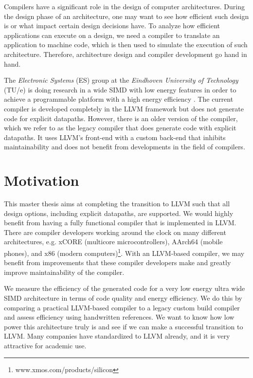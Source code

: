 Compilers have a significant role in the design of computer architectures. During the design phase of an architecture, one may want to see how efficient such design is or what impact certain design decisions have. To analyze how efficient applications can execute on a design, we need a compiler to translate an application to machine code, which is then used to simulate the execution of such architecture. Therefore, architecture design and compiler development go hand in hand.  

The \emph{Electronic Systems} (ES) group at the \emph{Eindhoven University of Technology} (TU/e) is doing research in a wide SIMD with low energy features in order to achieve a programmable platform with a high energy efficiency \cite{dongrio1}. The current compiler is developed completely in the LLVM framework but does not generate code for explicit datapaths. However, there is an older version of the compiler, which we refer to as the legacy compiler that does generate code with explicit datapaths. It uses LLVM's front-end with a custom back-end that inhibits maintainability and does not benefit from developments in the field of compilers.

\newpage \section{Motivation}
This master thesis aims at completing the transition to LLVM such that all design options, including explicit datapaths, are supported. We would highly benefit from having a fully functional compiler that is implemented in LLVM. There are compiler developers working around the clock on many different architectures, e.g. xCORE (multicore microcontrollers), AArch64 (mobile phones), and x86 (modern computers)\footnote{www.xmos.com/products/silicon}. With an LLVM-based compiler, we may benefit from improvements that these compiler developers make and greatly improve maintainability of the compiler.

We measure the efficiency of the generated code for a very low energy ultra wide SIMD architecture in terms of code quality and energy efficiency. We do this by comparing a practical LLVM-based compiler to a legacy custom build compiler and assess efficiency using handwritten references. We want to know how low power this architecture truly is and see if we can make a successful transition to LLVM. Many companies have standardized to LLVM already, and it is very attractive for academic use. %

